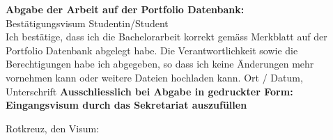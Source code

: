 \documentclass[main.tex]{subfiles} %
\begin{document}
\noindent
\textbf{Abgabe der Arbeit auf der Portfolio Datenbank:}\\
Bestätigungsvisum Studentin/Student\\
Ich bestätige, dass ich die Bachelorarbeit korrekt gemäss Merkblatt auf der Portfolio
Datenbank abgelegt habe. Die Verantwortlichkeit sowie die Berechtigungen habe ich abgegeben, so
dass ich keine Änderungen mehr vornehmen kann oder weitere Dateien hochladen kann.
\newline
\newline
Ort / Datum, Unterschrift	\underline{\hspace*{4cm}}
\newline
\newline
\newline
\newline
\newline
\noindent
{\textbf{Ausschliesslich bei Abgabe in gedruckter Form:
        Eingangsvisum durch das Sekretariat auszufüllen}}
\newline


\vspace*{2cm}
\noindent
Rotkreuz, den \underline{\hspace*{4cm}} \hspace*{4cm}
Visum: \underline{\hspace*{4cm}}
\end{document}
